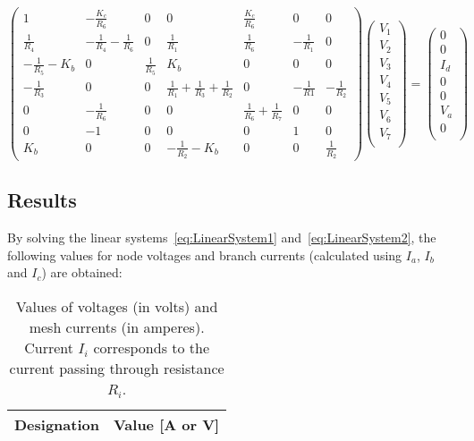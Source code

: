 \begin{equation}
  \begin{pmatrix}
    1 & -\frac{K_c}{R_6} & 0 & 0 & \frac{K_c}{R_6} & 0 & 0 \\
    \frac{1}{R_4} & -\frac{1}{R_4}-\frac{1}{R_6} & 0 & \frac{1}{R_1} & \frac{1}{R_6} & -\frac{1}{R_1} & 0 \\
    -\frac{1}{R_5}-K_b & 0 & \frac{1}{R_5} & K_b & 0 & 0 & 0 \\
    -\frac{1}{R_3} & 0 & 0 & \frac{1}{R_1}+\frac{1}{R_3}+\frac{1}{R_2} & 0 & -\frac{1}{R1} & -\frac{1}{R_2} \\
    0 & -\frac{1}{R_6} & 0 & 0 & \frac{1}{R_6}+\frac{1}{R_7} & 0 & 0 \\
    0 & -1 & 0 & 0 & 0 & 1 & 0 \\
    K_b & 0 & 0 & -\frac{1}{R_2}-K_b & 0 & 0 & \frac{1}{R_2}
  \end{pmatrix}
  \begin{pmatrix}
    V_1  \\
    V_2  \\
    V_3  \\
    V_4  \\
    V_5  \\
    V_6  \\
    V_7  \\
  \end{pmatrix}
  =
  \begin{pmatrix}
    0   \\
    0   \\
    I_d \\
    0   \\
    0   \\
    V_a \\
    0   \\
  \end{pmatrix}
  \label{eq:LinearSystem2}
\end{equation}


\subsection{Results}
By solving the linear systems~\ref{eq:LinearSystem1} and~\ref{eq:LinearSystem2}, the following values for node voltages and branch currents (calculated using $I_a$, $I_b$ and $I_c$) are obtained:

\begin{table}[H]
  \centering
  \begin{tabular}{|c|c|}
    \hline
        {\bf Designation} & {\bf Value [A or V]} \\ \hline
        
  \end{tabular}
  \caption{Values of voltages (in volts) and mesh currents (in amperes). Current $I_i$ corresponds to the current passing through resistance $R_i$.}
  \label{tab:Theoretical}
\end{table}



